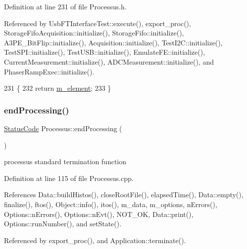 Definition at line 231 of file Processus.\+h.



Referenced by Usb\+F\+T\+Interface\+Test\+::execute(), export\+\_\+proc(), Storage\+Fifo\+Acquisition\+::initialize(), Storage\+Fifo\+::initialize(), A3\+P\+E\+\_\+\+Bit\+Flip\+::initialize(), Acquisition\+::initialize(), Test\+I2\+C\+::initialize(), Test\+S\+P\+I\+::initialize(), Test\+U\+S\+B\+::initialize(), Emulate\+F\+E\+::initialize(), Current\+Measurement\+::initialize(), A\+D\+C\+Measurement\+::initialize(), and Phaser\+Ramp\+Exec\+::initialize().


\begin{DoxyCode}
231                       \{
232     \textcolor{keywordflow}{return} \hyperlink{classProcessus_aa9d24d53c3e52f36786cabb5d8e296e7}{m\_element};
233   \}
\end{DoxyCode}
\mbox{\label{classProcessus_a5e4da662989d356b89d490b89c7afbfd}} 
\subsubsection{\texorpdfstring{end\+Processing()}{endProcessing()}}
{\footnotesize\ttfamily \hyperlink{classStatusCode}{Status\+Code} Processus\+::end\+Processing (\begin{DoxyParamCaption}{ }\end{DoxyParamCaption})}

processus standard termination function 

Definition at line 115 of file Processus.\+cpp.



References Data\+::build\+Histos(), close\+Root\+File(), elapsed\+Time(), Data\+::empty(), finalize(), ftos(), Object\+::info(), itos(), m\+\_\+data, m\+\_\+options, n\+Errors(), Options\+::n\+Errors(), Options\+::n\+Evt(), N\+O\+T\+\_\+\+OK, Data\+::print(), Options\+::run\+Number(), and set\+State().



Referenced by export\+\_\+proc(), and Application\+::terminate().


